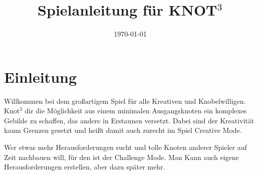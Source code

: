 \documentclass{scrartcl}
\begin{document}
\title{\textbf{Spielanleitung für KNOT$^3$}}
\date{\today}

\maketitle

\section*{Einleitung}
Willkommen bei dem großartigem Spiel für alle Kreativen und Knobelwilligen.
Knot$^3$ dir die Möglichkeit aus einem minimalen Ausgangsknoten ein komplexes Gebilde zu schaffen, das andere in Erstaunen versetzt. Dabei sind der Kreativität kaum Grenzen gesetzt und heißt damit auch zurecht im Spiel Creative Mode.

Wer etwas mehr Herausforderungen sucht und tolle Knoten anderer Spieler auf Zeit nachbauen will, für den ist der Challenge Mode. Man Kann auch eigene Herausforderungen erstellen, aber dazu später mehr.
\end{document}

